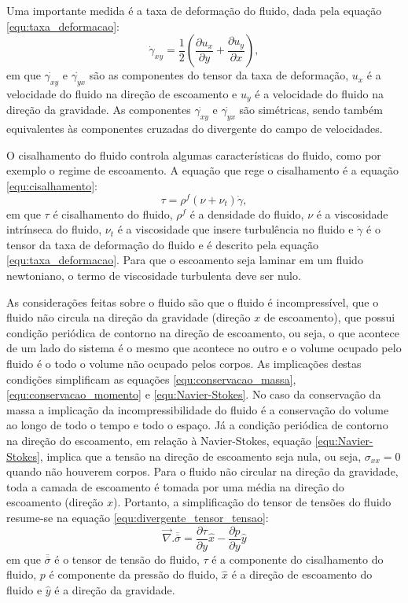     Uma importante medida é a taxa de deformação do fluido, dada pela equação \ref{equ:taxa_deformacao}:
\begin{equation}
    \label{equ:taxa_deformacao}
    \dot{\gamma}_{xy} = \frac{1}{2} \left(\frac{\partial u_{x}}{\partial y} +\frac{\partial u_{y}}{\partial x} \right),
\end{equation}
em que $\dot{\gamma_{xy}}$ e $\dot{\gamma_{yx}}$ são as componentes do tensor da taxa de deformação, $u_{x}$ é a velocidade do fluido na direção de escoamento e $u_{y}$ é a velocidade do fluido na direção da gravidade. As componentes $\dot{\gamma_{xy}}$ e $\dot{\gamma_{yx}}$ são simétricas, sendo também equivalentes às componentes cruzadas do divergente do campo de velocidades.

    O cisalhamento do fluido controla algumas características do fluido, como por exemplo o regime de escoamento. A equação que rege o cisalhamento é a equação \ref{equ:cisalhamento}:
\begin{equation}
    \label{equ:cisalhamento}
    \tau = \rho^{f}(\nu+\nu_{t})\dot{\gamma},
\end{equation}
em que $\tau$ é cisalhamento do fluido, $\rho^{f}$ é a densidade do fluido, $\nu$ é a viscosidade intrínseca do fluido, $\nu_{t}$ é a viscosidade que insere turbulência no fluido e $\dot{\gamma}$ é o tensor da taxa de deformação do fluido e é descrito pela equação \ref{equ:taxa_deformacao}. Para que o escoamento seja laminar em um fluido newtoniano, o termo de viscosidade turbulenta deve ser nulo.

    As considerações feitas sobre o fluido são que o fluido é incompressível, que o fluido não circula na direção da gravidade (direção $x$ de escoamento), que possui condição periódica de contorno na direção de escoamento, ou seja, o que acontece de um lado do sistema é o mesmo que acontece no outro e o volume ocupado pelo fluido é o todo o volume não ocupado pelos corpos. As implicações destas condições simplificam as equações \ref{equ:conservacao_massa}, \ref{equ:conservacao_momento} e \ref{equ:Navier-Stokes}. No caso da conservação da massa a implicação da incompressibilidade do fluido é a conservação do volume ao longo de todo o tempo e todo o espaço. Já a condição periódica de contorno na direção do escoamento, em relação à  Navier-Stokes, equação \ref{equ:Navier-Stokes}, implica que a tensão na direção de escoamento seja nula, ou seja, $\sigma_{xx} = 0$ quando não houverem corpos. Para o fluido não circular na direção da gravidade, toda a camada de escoamento é tomada por uma média na direção do escoamento (direção $x$). Portanto, a simplificação do tensor de tensões do fluido resume-se na equação \ref{equ:divergente_tensor_tensao}:
\begin{equation}
    \label{equ:divergente_tensor_tensao}
    \vec{\nabla}.\overline{\overline{\sigma}} = \frac{\partial \tau}{\partial y} \hat{x} - \frac{\partial p}{\partial y} \hat{y}
\end{equation}
em que $\overline{\overline{\sigma}}$ é o tensor de tensão do fluido, $\tau$ é a componente do cisalhamento do fluido, $p$ é componente da pressão do fluido, $\hat{x}$ é a direção de escoamento do fluido e $\hat{y}$ é a direção da gravidade.

